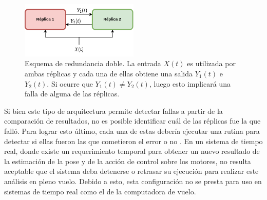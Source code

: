 \begin{figure}[H]
    \centering
    \includegraphics[width=0.5\textwidth]{img/redundancia_doble.png}
    \caption{Esquema de redundancia doble. La entrada $X(t)$ es utilizada por ambas réplicas y cada una de ellas obtiene una salida $Y_1(t)$ e $Y_2(t)$. Si ocurre que $Y_1(t) \neq Y_2(t)$, luego esto implicará una falla de alguna de las réplicas. }
    \label{fig:redundancia_doble}
\end{figure}


Si bien este tipo de arquitectura permite detectar fallas a partir de la comparación de resultados, no es posible identificar cuál de las réplicas fue la que falló. Para lograr esto último, cada una de estas debería ejecutar una rutina para detectar si ellas fueron las que cometieron el error o no \cite{baleani2003fault}. En un sistema de tiempo real, donde existe un requerimiento temporal para obtener un nuevo resultado de la estimación de la pose y de la acción de control sobre los motores, no resulta aceptable que el sistema deba detenerse o retrasar su ejecución para realizar este análisis en pleno vuelo. Debido a esto, esta configuración no se presta para uso en sistemas de tiempo real como el de la computadora de vuelo.


